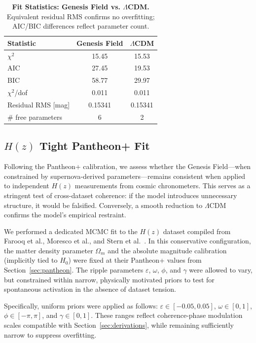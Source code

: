\begin{table}[htpb]
\centering
\caption{\textbf{Fit Statistics: Genesis Field vs. $\Lambda$CDM.} Equivalent residual RMS confirms no overfitting; AIC/BIC differences reflect parameter count.}
\vspace{0.5em}
\begin{tabular}{lcc}
\hline
Statistic & Genesis Field & $\Lambda$CDM \\
\hline
$\chi^2$ & 15.45 & 15.53 \\
AIC & 27.45 & 19.53 \\
BIC & 58.77 & 29.97 \\
$\chi^2$/dof & 0.011 & 0.011 \\
Residual RMS [mag] & 0.15341 & 0.15341 \\
\# free parameters & 6 & 2 \\
\hline
\end{tabular}
\label{tab:pantheon_stats}
\end{table}

\subsection{\texorpdfstring{$H(z)$}{Hz} Tight Pantheon+ Fit}
\label{sec:hz_tight}

Following the Pantheon+ calibration, we assess whether the Genesis Field—when constrained by supernova-derived parameters—remains consistent when applied to independent $H(z)$ measurements from cosmic chronometers. This serves as a stringent test of cross-dataset coherence: if the model introduces unnecessary structure, it would be falsified. Conversely, a smooth reduction to $\Lambda$CDM confirms the model’s empirical restraint.

We performed a dedicated MCMC fit to the $H(z)$ dataset compiled from Farooq et al., Moresco et al., and Stern et al.~\cite{Farooq2017, Moresco2016, Stern2010}. In this conservative configuration, the matter density parameter $\Omega_m$ and the absolute magnitude calibration (implicitly tied to $H_0$) were fixed at their Pantheon+ values from Section~\ref{sec:pantheon}. The ripple parameters $\varepsilon$, $\omega$, $\phi$, and $\gamma$ were allowed to vary, but constrained within narrow, physically motivated priors to test for spontaneous activation in the absence of dataset tension.

Specifically, uniform priors were applied as follows: $\varepsilon \in [-0.05, 0.05]$, $\omega \in [0, 1]$, $\phi \in [-\pi, \pi]$, and $\gamma \in [0, 1]$. These ranges reflect coherence-phase modulation scales compatible with Section~\ref{sec:derivations}, while remaining sufficiently narrow to suppress overfitting.

